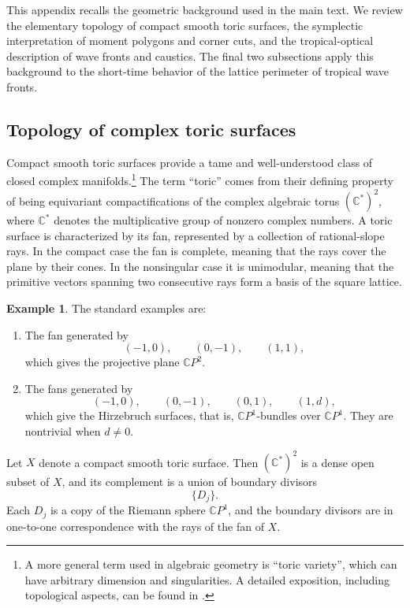 \documentclass[a4paper,american,11pt]{amsart}
\theoremstyle{plain}
\theoremstyle{definition}
\newtheorem{example}[theorem]{Example}
\newcommand{\C}{\mathbb C}
\begin{document}
This appendix recalls the geometric background used in the main text.  We
review the elementary topology of compact smooth toric surfaces, the
symplectic interpretation of moment polygons and corner cuts, and the
tropical-optical description of wave fronts and caustics.  The final two
subsections apply this background to the short-time behavior of the lattice
perimeter of tropical wave fronts.

\subsection{Topology of complex toric surfaces}\label{ssec:topologycomplex}

Compact smooth toric surfaces provide a tame and well-understood class of
closed complex manifolds.\footnote{A more general term used in algebraic
geometry is ``toric variety'', which can have arbitrary dimension and
singularities.  A detailed exposition, including topological aspects, can be
found in \cite{cox2024toric}.}
The term ``toric'' comes from their defining property of being equivariant
compactifications of the complex algebraic torus \((\C^*)^2\), where
\(\C^*\) denotes the multiplicative group of nonzero complex numbers.  A
toric surface is characterized by its fan, represented by a collection of
rational-slope rays.  In the compact case the fan is complete, meaning that
the rays cover the plane by their cones.  In the nonsingular case it is
unimodular, meaning that the primitive vectors spanning two consecutive rays
form a basis of the square lattice.

\begin{example}\label{ex_toric}
The standard examples are:
\begin{enumerate}
\item The fan generated by
\[
(-1,0),\qquad (0,-1),\qquad (1,1),
\]
which gives the projective plane \(\C P^2\).
\item The fans generated by
\[
(-1,0),\qquad (0,-1),\qquad (0,1),\qquad (1,d),
\]
which give the Hirzebruch surfaces, that is, \(\C P^1\)-bundles over
\(\C P^1\).  They are nontrivial when \(d\neq0\).
\end{enumerate}
\end{example}

Let \(X\) denote a compact smooth toric surface.  Then \((\C^*)^2\) is a
dense open subset of \(X\), and its complement is a union of boundary
divisors
\[
\{D_j\}.
\]
Each \(D_j\) is a copy of the Riemann sphere \(\C P^1\), and the boundary
divisors are in one-to-one correspondence with the rays of the fan of \(X\).
\end{document}
